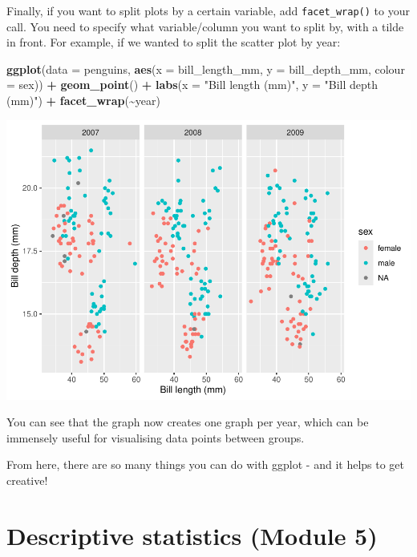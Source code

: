\documentclass[
]{book}
\newenvironment{Shaded}{\begin{snugshade}}{\end{snugshade}}
\newcommand{\AttributeTok}[1]{\textcolor[rgb]{0.13,0.29,0.53}{#1}}
\newcommand{\FunctionTok}[1]{\textcolor[rgb]{0.13,0.29,0.53}{\textbf{#1}}}
\newcommand{\NormalTok}[1]{#1}
\newcommand{\SpecialCharTok}[1]{\textcolor[rgb]{0.81,0.36,0.00}{\textbf{#1}}}
\newcommand{\StringTok}[1]{\textcolor[rgb]{0.31,0.60,0.02}{#1}}
\begin{document}
Finally, if you want to split plots by a certain variable, add \texttt{facet\_wrap()} to your call. You need to specify what variable/column you want to split by, with a tilde in front. For example, if we wanted to split the scatter plot by year:

\begin{Shaded}
\begin{Highlighting}[]
\FunctionTok{ggplot}\NormalTok{(}\AttributeTok{data =}\NormalTok{ penguins, }\FunctionTok{aes}\NormalTok{(}\AttributeTok{x =}\NormalTok{ bill\_length\_mm, }\AttributeTok{y =}\NormalTok{ bill\_depth\_mm, }\AttributeTok{colour =}\NormalTok{ sex)) }\SpecialCharTok{+} \FunctionTok{geom\_point}\NormalTok{() }\SpecialCharTok{+}
  \FunctionTok{labs}\NormalTok{(}\AttributeTok{x =} \StringTok{"Bill length (mm)"}\NormalTok{, }\AttributeTok{y =} \StringTok{"Bill depth (mm)"}\NormalTok{)  }\SpecialCharTok{+} 
  \FunctionTok{facet\_wrap}\NormalTok{(}\SpecialCharTok{\textasciitilde{}}\NormalTok{year)}
\end{Highlighting}
\end{Shaded}

\includegraphics{_main_files/figure-latex/unnamed-chunk-64-1.pdf}

You can see that the graph now creates one graph per year, which can be immensely useful for visualising data points between groups.

From here, there are so many things you can do with ggplot - and it helps to get creative!

\chapter{Descriptive statistics (Module 5)}\label{descriptives}
\end{document}
